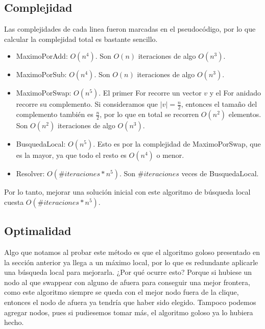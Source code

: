 \subsection{Complejidad}

Las complejidades de cada linea fueron marcadas en el pseudocódigo, por lo que calcular la complejidad total es bastante sencillo.

\begin{itemize}
    \item MaximoPorAdd: $O(n^4)$. Son $O(n)$ iteraciones de algo $O(n^3)$.
    \item MaximoPorSub: $O(n^4)$. Son $O(n)$ iteraciones de algo $O(n^3)$.
    \item MaximoPorSwap: $O(n^5)$. El primer For recorre un vector $v$ y el For anidado recorre su complemento. Si consideramos que $|v| = \frac{n}{2}$, entonces el tamaño del complemento también es $\frac{n}{2}$, por lo que en total se recorren $O(n^2)$ elementos. Son $O(n^2)$ iteraciones de algo $O(n^3)$.
    \item BusquedaLocal: $O(n^5)$. Esto es por la complejidad de MaximoPorSwap, que es la mayor, ya que todo el resto es $O(n^4)$ o menor.
    \item Resolver: $O(\#iteraciones * n^5)$. Son $\#iteraciones$ veces de BusquedaLocal.
\end{itemize}

Por lo tanto, mejorar una solución inicial con este algoritmo de búsqueda local cuesta $O(\#iteraciones * n^5)$.

\subsection{Optimalidad}

Algo que notamos al probar este método es que el algoritmo goloso presentado en la sección anterior ya llega a un máximo local, por lo que es redundante aplicarle una búsqueda local para mejorarla. ¿Por qué ocurre esto? Porque si hubiese un nodo al que swappear con alguno de afuera para conseguir una mejor frontera, como este algoritmo siempre se queda con el mejor nodo fuera de la clique, entonces el nodo de afuera ya tendría que haber sido elegido. Tampoco podemos agregar nodos, pues si pudiesemos tomar más, el algoritmo goloso ya lo hubiera hecho.  \\


